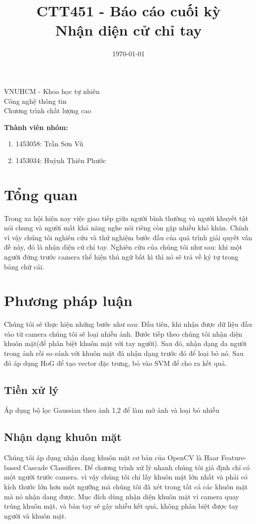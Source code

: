 \documentclass[a4paper, 12pt]{article}
\title{CTT451 - Báo cáo cuối kỳ \\ Nhận diện cử chỉ tay}
\date{\today}
\begin{document}
\begin{center} 
\large VNUHCM - Khoa học tự nhiên \\
Công nghệ thông tin \\
Chương trình chất lượng cao \\
\end{center}
\begingroup
\let\newpage\relax
\maketitle
\endgroup
\textbf{Thành viên nhóm:}
\begin{enumerate}
	\item 1453058: Trần Sơn Vũ
	\item 1453034: Huỳnh Thiên Phước
\end{enumerate}

\section{Tổng quan}
Trong xa hội hiện nay việc giao tiếp giữa người bình thường và người khuyết tật nói chung và người mất khả năng nghe nói riêng còn gặp nhiều khó khăn. Chính vì vậy chúng tôi nghiên cứu và thử nghiệm bước đầu của quá trình giải quyết vấn đề này, đó là nhận diện cử chỉ tay. Nghiên cứu của chúng tôi như sau: khi một người đứng trước camera thể hiện thủ ngữ bất kì thì nó sẽ trả về ký tự trong bảng chữ cái.
\section{Phương pháp luận}
Chúng tôi sẽ thực hiện những bước như sau: Đầu tiên, khi nhận được dữ liệu đầu vào từ camera chúng tôi sẽ loại nhiễu ảnh. Bước tiếp theo chúng tôi nhận diện khuôn mặt(để phân biệt khuôn mặt với tay người). Sau đó, nhận dạng da người trong ảnh rồi so sánh với khuôn mặt đã nhận dạng trước đó để loại bỏ nó. Sau đó áp dụng HoG để tạo vector đặc trưng, bỏ vào SVM để cho ra kết quả.
\subsection{Tiền xử lý}
Áp dụng bộ lọc Gaussian theo ảnh 1,2 để làm mờ ảnh và loại bỏ nhiễu
\subsection{Nhận dạng khuôn mặt }
Chúng tôi áp dụng nhận dạng khuôn mặt cơ bản của OpenCV là Haar Feature-based Cascade Classifiers. Để chương trình xử lý nhanh chúng tôi giả định chỉ có một người trước camera. vì vậy chúng tôi chỉ lấy khuôn mặt lớn nhất và phải có kích thước lớn hơn một ngưỡng mà chúng tôi đã xét trong tất cả các khuôn mặt mà nó nhận dang được.
Mục đích dùng nhận diện khuôn mặt vì camera quay trúng khuôn mặt, và bàn tay sẽ gây nhiễu kết quả, không phân biệt được tay người và khuôn mặt. 
\end{document}
